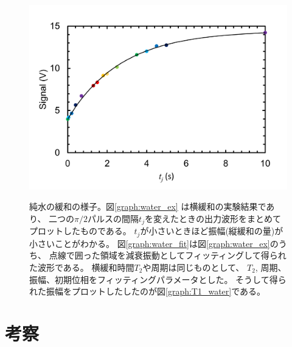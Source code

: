 \documentclass[11pt,dvipdfmx,a4paper]{jsarticle}
\begin{document}
\begin{figure}[H]
\begin{minipage}[t]{0.48\columnwidth}
		\includegraphics[width=\columnwidth]{graph/T1_water.png}
		\label{graph:T1_water}
	\end{minipage}
	\caption{純水の緩和の様子。図\ref{graph:water_ex} は横緩和の実験結果であり、
	二つの\(\pi/2\)パルスの間隔\(t_j\)を変えたときの出力波形をまとめてプロットしたものである。
	\(t_j\)が小さいときほど振幅(縦緩和の量)が小さいことがわかる。
	図\ref{graph:water_fit}は図\ref{graph:water_ex}のうち、
	点線で囲った領域を減衰振動としてフィッティングして得られた波形である。
	横緩和時間\(T_2\)や周期は同じものとして、
	\(T_2\), 周期、振幅、初期位相をフィッティングパラメータとした。
	そうして得られた振幅をプロットしたしたのが図\ref{graph:T1_water}である。}
	\label{graph:water}
\end{figure}


\section{考察}
\end{document}

